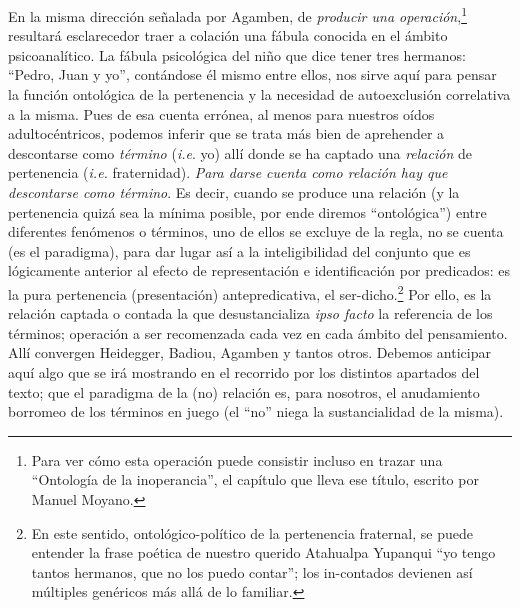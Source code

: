 En la misma dirección señalada por Agamben, de \emph{producir una operación},\footnote{Para ver cómo esta operación puede consistir incluso en trazar una \enquote{Ontología de la inoperancia}, el capítulo que lleva ese título, escrito por Manuel Moyano.} resultará esclarecedor  traer a colación una fábula conocida en el ámbito psicoanalítico. La fábula psicológica del niño que dice tener tres hermanos: \enquote{Pedro, Juan y yo}, contándose él mismo entre ellos, nos sirve aquí para pensar la función ontológica de la pertenencia y la necesidad de autoexclusión correlativa a la misma. Pues de esa cuenta errónea, al menos para nuestros oídos adultocéntricos, podemos inferir que se trata más bien de aprehender a descontarse como \emph{término} (\emph{i.e}. yo) allí donde se ha captado una \emph{relación} de pertenencia (\emph{i.e.} fraternidad). \emph{Para darse cuenta como relación hay que descontarse como término}. Es decir, cuando se produce una relación (y la pertenencia quizá sea la mínima posible, por ende diremos \enquote{ontológica}) entre diferentes fenómenos o términos, uno de ellos se excluye de la regla, no se cuenta (es el paradigma), para dar lugar así a la inteligibilidad del conjunto que es lógicamente anterior al efecto de representación e identificación por predicados: es la pura pertenencia (presentación) antepredicativa, el ser-dicho.\footnote{En este sentido, ontológico-político de la pertenencia fraternal, se puede entender la frase poética de nuestro querido Atahualpa Yupanqui \enquote{yo tengo tantos hermanos, que no los puedo contar}; los in-contados devienen así múltiples genéricos más allá de lo familiar.} Por ello, es la relación captada o contada la que desustancializa \emph{ipso facto} la referencia de los términos; operación a ser recomenzada cada vez en cada ámbito del pensamiento. Allí convergen Heidegger, Badiou, Agamben y tantos otros. Debemos anticipar aquí algo que se irá mostrando en el recorrido por los distintos apartados del texto; que el paradigma de la (no) relación es, para nosotros, el anudamiento borromeo de los términos en juego (el \enquote{no} niega la sustancialidad de la misma).

